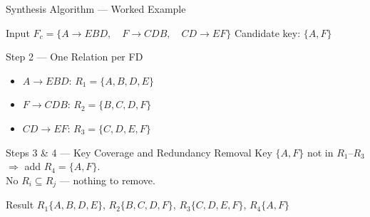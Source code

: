 \begin{frame}{Synthesis Algorithm --- Worked Example}
  \begin{block}{Input}
    $F_c = \{A \to EBD, \quad F \to CDB, \quad CD \to EF\}$
    \hfill Candidate key: $\{A, F\}$
  \end{block}

  \begin{block}{Step 2 --- One Relation per FD}
    \begin{itemize}
      \item $A \to EBD$: \quad $R_1 = \{A, B, D, E\}$
      \item $F \to CDB$: \quad $R_2 = \{B, C, D, F\}$
      \item $CD \to EF$: \quad $R_3 = \{C, D, E, F\}$
    \end{itemize}
  \end{block}

  \begin{block}{Steps 3 \& 4 --- Key Coverage and Redundancy Removal}
    Key $\{A,F\}$ not in $R_1$--$R_3$ $\Rightarrow$ add $R_4 = \{A, F\}$.\\
    No $R_i \subseteq R_j$ --- nothing to remove.
  \end{block}

  \begin{block}{Result}
    $R_1\{A,B,D,E\}$, \; $R_2\{B,C,D,F\}$, \; $R_3\{C,D,E,F\}$, \; $R_4\{A,F\}$
  \end{block}
\end{frame}

